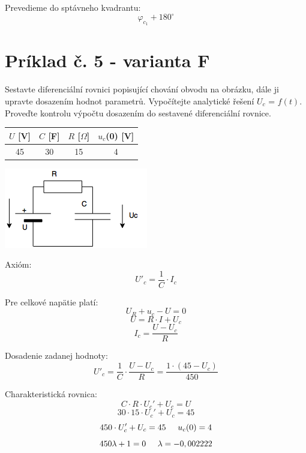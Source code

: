 \documentclass[a4paper,11pt,titlepage]{article}
\begin{document}
\vspace{5mm}

Prevedieme do sptávneho kvadrantu:
\[\varphi_{c_1} + 180^{\circ}\]


\newpage

\section{Príklad č. 5 - varianta F}

Sestavte diferenciální rovnici popisující chování obvodu na obrázku, dále ji upravte dosazením hodnot parametrů. Vypočítejte analytické řešení $U_c$ = $f(t)$. Proveďte kontrolu výpočtu dosazením do sestavené diferenciální rovnice.

\vspace{5mm}

\begin{tabular}{ |c|c|c|c| } \hline
    $U$ [V] & $C$ [F] & $R$ [$\Omega$] & $u_c$(0) [V]  \\ \hline
    45 & 30 & 15 & 4 \\ \hline
\end{tabular}

\vspace{5mm}

\includegraphics[scale=0.7]{diagram.png}

\vspace{5mm}

Axióm:
\[U'_c = \frac{1}{C} \cdot I_c\]

\vspace{5mm}

Pre celkové napätie platí:
\[U_R + u_c - U = 0 \]
\[U = R \cdot I + U_c \] 
\[I_c = \frac{U - U_c}{R} \]

\vspace{5mm}

Dosadenie zadanej hodnoty:
\[U'_c = \frac{1}{C} \cdot \frac{U - U_c}{R} = \frac{1 \cdot (45 - U_c)}{450} \]

\vspace{5mm}

Charakteristická rovnica:
\[C \cdot R \cdot U_c' + U_c = U\]
\[30 \cdot 15 \cdot U_c' + U_c = 45\]
\[ 450 \cdot U_c' + U_c = 45 \hspace{5mm} u_c(0) = 4\]
\[450\lambda + 1 = 0 \hspace{5mm} \lambda = -0,002222\]
\end{document}
